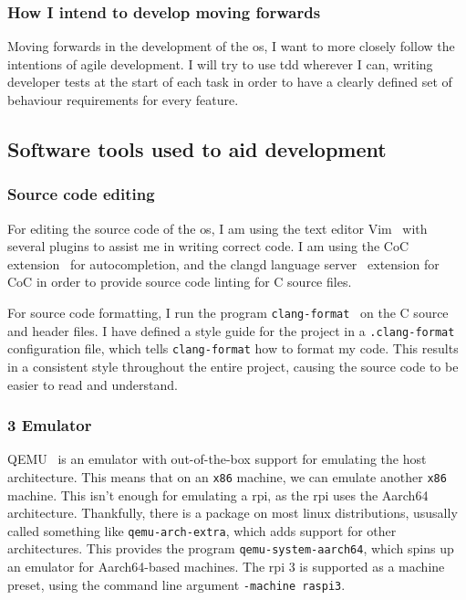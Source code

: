 \documentclass{article}
\begin{document}
\subsubsection{How I intend to develop moving forwards}
Moving forwards in the development of the \gls{os}, I want to more closely
follow the intentions of agile development. I will try to use \gls{tdd}
wherever I can, writing developer tests at the start of each task in order to
have a clearly defined set of behaviour requirements for every feature.

\subsection{Software tools used to aid development}
\subsubsection{Source code editing}
For editing the source code of the \gls{os}, I am using the text editor
Vim~\cite{vim} with several plugins to assist me in writing correct code. I am
using the CoC extension~\cite{vim-coc} for autocompletion, and the clangd
language server~\cite{clangd} extension for CoC in order to provide source code
linting for C source files.

For source code formatting, I run the program
\texttt{clang-format}~\cite{clang-format} on the C source and header files. I
have defined a style guide for the project in a \texttt{.clang-format}
configuration file, which tells \texttt{clang-format} how to format my code.
This results in a consistent style throughout the entire project, causing the
source code to be easier to read and understand.

\subsubsection{\texorpdfstring{}{RPi} 3 Emulator}
QEMU~\cite{qemu} is an emulator with out-of-the-box support for emulating the
host architecture. This means that on an \texttt{x86} machine, we can
emulate another \texttt{x86} machine. This isn't enough for emulating a
\gls{rpi}, as the \gls{rpi} uses the Aarch64 architecture. Thankfully, there is
a package on most linux distributions, ususally called something like
\texttt{qemu-arch-extra}, which adds support for other architectures. This
provides the program \texttt{qemu-system-aarch64}, which spins up an emulator
for Aarch64-based machines. The \gls{rpi} 3 is supported as a machine preset,
using the command line argument \texttt{-machine raspi3}.
\end{document}
